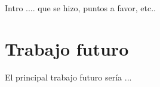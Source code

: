 
Intro .... que se hizo, puntos a favor, etc..

\section{Trabajo futuro}

El principal trabajo futuro sería ...
